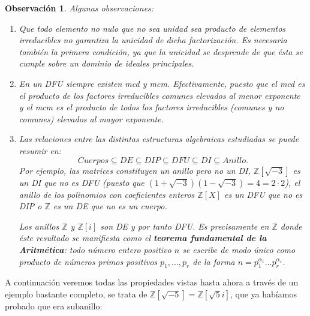 \documentclass[12pt]{article}
\newtheorem{observation}{Observación}[theorem]
\begin{document}
\begin{observation} Algunas observaciones:\begin{enumerate}
\item Que todo elemento no nulo que no sea unidad sea producto de elementos irreducibles no garantiza la unicidad de dicha factorización. Es necesaria también la primera condición, ya que la unicidad se desprende de que ésta se cumple sobre un dominio de ideales principales.
\item En un DFU siempre existen mcd y mcm. Efectivamente, puesto que el mcd es el producto de los factores irreducibles comunes elevados al menor exponente y el mcm es el producto de todos los factores irreducibles (comunes y no comunes) elevados al mayor exponente.
\item Las relaciones entre las distintas estructuras algebraicas estudiadas se puede resumir en: $$Cuerpos \subseteq DE \subseteq DIP \subseteq DFU 	\subseteq DI \subseteq Anillo.$$
Por ejemplo, las matrices constituyen un anillo pero no un DI, $\mathbb{Z}[\sqrt{-3}]$ es un DI que no es DFU (puesto que $(1+\sqrt{-3})(1-\sqrt{-3}) = 4 = 2 \cdot 2$), el anillo de los polinomios con coeficientes enteros $\mathbb{Z}[X]$ es un DFU que no es DIP o $\mathbb{Z}$ es un DE que no es un cuerpo. 

Los anillos $\mathbb{Z}$ y $\mathbb{Z}[i]$ son DE y por tanto DFU. Es precisamente en $\mathbb{Z}$ donde éste resultado se manifiesta como el \textbf{\textit{teorema fundamental de la Aritmética}}: \textit{todo número entero positivo $n$ se escribe de modo único como producto de números primos positivos $p_{1}, \ldots, p_{r}$ de la forma $n = p_{1}^{\alpha_{1}} \ldots p_{r}^{\alpha_{r}}.$}
\end{enumerate}
\end{observation}

A continuación veremos todas las propiedades vistas hasta ahora a través de un ejemplo bastante completo, se trata de $\mathbb{Z}[\sqrt{-5}] =\mathbb{Z}[\sqrt{5}i]$, que ya habíamos probado que era subanillo:
\end{document}
